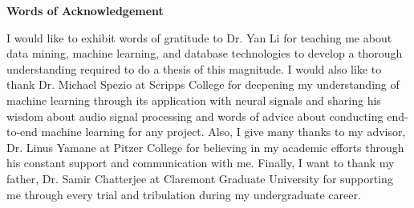 \doublespacing
\setlength{\parindent}{1cm}

\begin{center}
  \textbf{\large Words of Acknowledgement}
\end{center}
I would like to exhibit words of gratitude to Dr. Yan Li for teaching me about data mining, machine learning, and database technologies to develop a thorough understanding required to do a thesis of this magnitude. I would also like to thank Dr. Michael Spezio at Scripps College for deepening my understanding of machine learning through its application with neural signals and sharing his wisdom about audio signal processing and words of advice about conducting end-to-end machine learning for any project. Also, I give many thanks to my advisor, Dr. Linus Yamane at Pitzer College for believing in my academic efforts through his constant support and communication with me. Finally, I want to thank my father, Dr. Samir Chatterjee at Claremont Graduate University for supporting me through every trial and tribulation during my undergraduate career.
